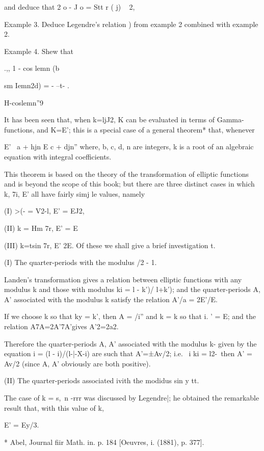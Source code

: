 and deduce that 2 o - J o = Stt r ( j) ~ 2,

Example 3. Deduce Legendre's relation ) from example 2
combined with example 2.

Example 4. Shew that

.,, 1 - cos lemn (b

sm Iemn2d) = - --t- .

H-coslemn''9


It has been seen that, when k=ljJ2, K can be evaluated in terms of
Gamma-functions, and K=E'; this is a special case of a general
theorem* that, whenever

E' \ a + hjn E c + djn'' where, b, c, d, n are integers, k is a root
of an algebraic equation with integral coefficients.

This theorem is based on the theory of the transformation of elliptic
functions and is beyond the scope of this book; but there are three
distinct cases in which k, 7i, E' all have fairly simj le values,
namely

(I) >(- = V2-l, E' = EJ2,

(II) k = Hm 7r, E' = E %

(III) k=tsin 7r, E' 2E. Of these we shall give a brief investigation
t.

(I) The quarter-periods with the modulus /2 - 1.

Landen's transformation gives a relation between elliptic functions
with any modulus k and those with modulus ki = l - k')/ l+k'); and the
quarter-periods A, A' associated with the modulus k satisfy the
relation A'/a = 2E'/E.

If we choose k so that ky = k', then A = /i'' and k = k so that i. ' =
E; and the relation A7A=2A'7A'gives A'2=2a2.

Therefore the quarter-periods A, A' associated with the modulus k-
given by the equation i = (l - i)/(l-|-X-i) are such that A'=±Av/2;
i.e. \ i ki = l2-\, then A' = Av/2 (since A, A' obviously are both
positive).

(II) The quarter-periods associated ivith the modidus sin y tt.

The case of k = s,\ n -rrr was discussed by Legendre|; he obtained the
remarkable result that, with this value of k,

E' = Ey/3.

* Abel, Journal fiir Math. in. p. 184 [Oeuvres, i. (1881), p. 377].

